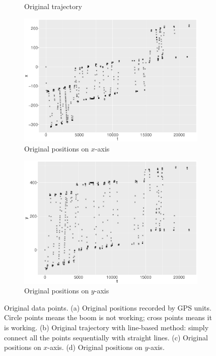 \begin{figure}
\begin{subfigure}{0.45\textwidth}
    \caption{Original trajectory }
    \end{subfigure}
    \begin{subfigure}{0.45\textwidth}
    \centering
    \includegraphics[width=\textwidth]{Chapters/02TractorSplineTheory/plot/ggplot/gg512PointsX.pdf}
    \caption{Original positions on $x$-axis  }
    \end{subfigure}
    \begin{subfigure}{0.45\textwidth}
    \centering
    \includegraphics[width=\textwidth]{Chapters/02TractorSplineTheory/plot/ggplot/gg512PointsY.pdf}
    \caption{Original positions on $y$-axis  }
    \end{subfigure}
\caption{Original data points. (a) Original positions recorded by GPS units. Circle points means the boom is not working; cross points means it is working. (b) Original trajectory with line-based method: simply connect all the points sequentially with straight lines. (c) Original positions on $x$-axis. (d)  Original positions on $y$-axis.}\label{original512}
 \end{figure}




